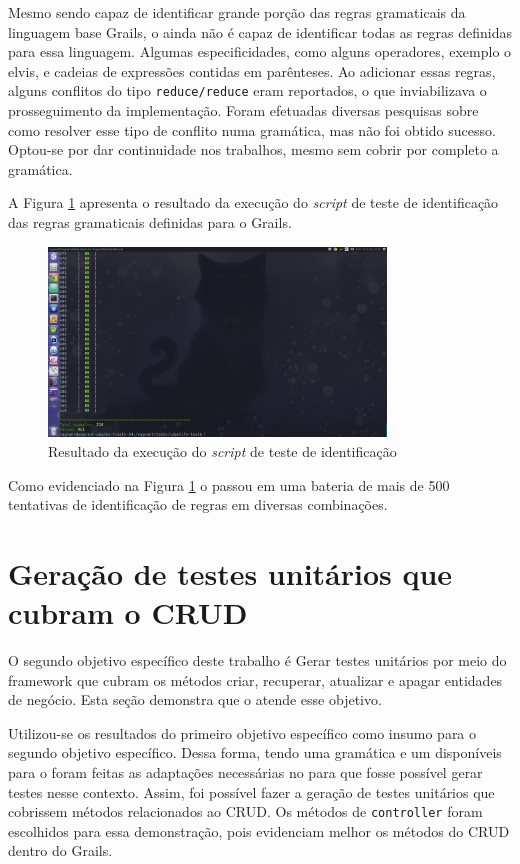 Mesmo sendo capaz de identificar grande porção das regras gramaticais da
linguagem base \textsf{Grails}, o \parser ainda não é capaz de identificar todas
as regras definidas para essa linguagem. Algumas especificidades, como alguns
operadores, exemplo o \textsf{elvis}, e cadeias de expressões contidas
em parênteses. Ao adicionar essas regras, alguns conflitos do tipo
\lstinline|reduce/reduce| eram reportados, o que inviabilizava o
prosseguimento da implementação. Foram efetuadas diversas pesquisas
sobre como resolver esse tipo de conflito numa gramática, mas não foi
obtido sucesso. Optou-se por dar continuidade nos trabalhos, mesmo sem
cobrir por completo a gramática.

A Figura \ref{identification-test} apresenta o resultado da execução do
\textit{script} de teste de identificação das regras gramaticais definidas
para o \textsf{Grails}.
\begin{figure}[h]
  \centering
    \includegraphics[width=0.8\textwidth]{figuras/identification-test.png}
    \caption{Resultado da execução do \textit{script} de teste de identificação}
    \label{identification-test}
\end{figure}
\FloatBarrier

Como evidenciado na Figura \ref{identification-test} o \parser passou em uma
bateria de mais de 500 tentativas de identificação de regras em diversas
combinações.

\section{Geração de testes unitários que cubram o CRUD}
O segundo objetivo específico deste trabalho é \textsf{Gerar testes unitários por meio
do framework que cubram os métodos criar, recuperar, atualizar e apagar
entidades de negócio}. Esta seção demonstra que o \scarefault atende
esse objetivo.

Utilizou-se os resultados do primeiro objetivo específico como insumo
para o segundo objetivo específico. Dessa forma, tendo uma gramática e
um \parser disponíveis para o \grails foram feitas as adaptações necessárias
no \framework para que fosse possível gerar testes nesse contexto.
Assim, foi possível fazer a geração de testes unitários que cobrissem
métodos relacionados ao CRUD. Os métodos de \lstinline|controller| foram
escolhidos para essa demonstração, pois evidenciam melhor os métodos
do CRUD dentro do \textsf{Grails}.

